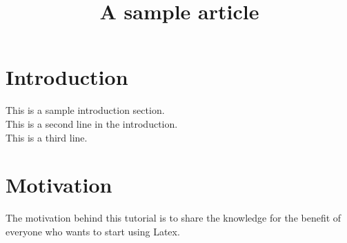 \documentclass[12pt,a4paper]{article}
\begin{document}
\title{A sample article}
\maketitle

\section{Introduction}
This is a sample introduction section.\\
This is a second line in the introduction.\\
This is a third line.

\section{Motivation}
The motivation behind this tutorial is to share the knowledge for the benefit of everyone who wants to start using Latex.
\end{document}
